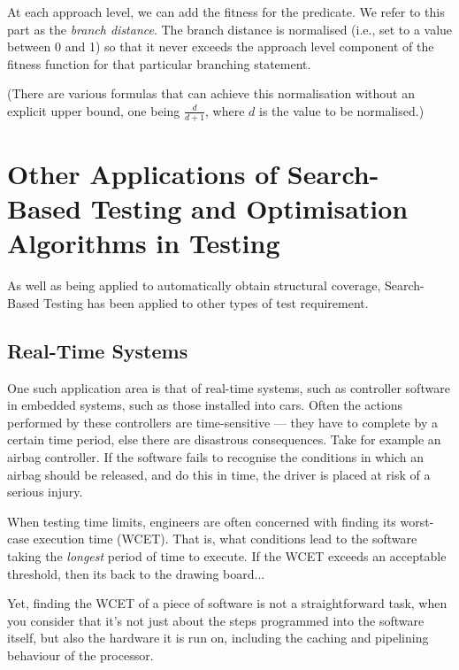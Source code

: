 
At each approach level, we can add the fitness for the predicate. We refer to
this part as the {\it branch distance}. The branch distance is normalised
(i.e., set to a value between 0 and 1) so that it never exceeds the approach
level component of the fitness function for that particular branching statement.


(There are various formulas that can achieve this normalisation without an
explicit upper bound, one being $\frac{d}{d+1}$, where $d$ is the value to be
normalised.)

\section{Other Applications of Search-Based Testing and Optimisation Algorithms
in Testing}

As well as being applied to automatically obtain structural coverage,
Search-Based Testing has been applied to other types of test requirement.

\subsection{Real-Time Systems}

One such application area is that of real-time systems, such as controller
software in embedded systems, such as those installed into cars. Often the
actions performed by these controllers are time-sensitive --- they have to
complete by a certain time period, else there are disastrous consequences. Take
for example an airbag controller. If the software fails to recognise the
conditions in which an airbag should be released, and do this in time, the
driver is placed at risk of a serious injury. 

When testing time limits, engineers are often concerned with finding its
worst-case execution time (WCET). That is, what conditions lead to the software
taking the {\it longest} period of time to execute. If the WCET exceeds an
acceptable threshold, then its back to the drawing board...

Yet, finding the WCET of a piece of software is not a straightforward task, when
you consider that it's not just about the steps programmed into the software
itself, but also the hardware it is run on, including the caching and pipelining
behaviour of the processor. 

